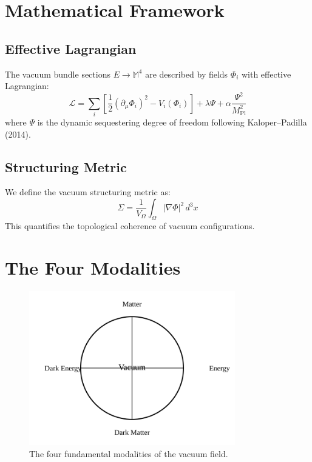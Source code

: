 \documentclass[12pt,a4paper]{article}
\newcommand{\structuring}{\Sigma}
\newcommand{\planck}{M_{\text{Pl}}}
\begin{document}
\section{Mathematical Framework}

\subsection{Effective Lagrangian}
The vacuum bundle sections $E \rightarrow \mathbb{M}^4$ are described by fields $\Phi_i$ with effective Lagrangian:
\begin{equation}
\mathcal{L} = \sum_i\left[\frac{1}{2}(\partial_\mu\Phi_i)^2 - V_i(\Phi_i)\right] + \lambda \Psi + \alpha\frac{\Psi^2}{\planck^2}
\label{eq:lagrangian}
\end{equation}
where $\Psi$ is the dynamic sequestering degree of freedom following Kaloper--Padilla (2014).

\subsection{Structuring Metric}
We define the vacuum structuring metric as:
\begin{equation}
\structuring = \frac{1}{V_\Omega}\int_\Omega |\nabla\Phi|^{2}\,d^{3}x
\label{eq:sigma}
\end{equation}
This quantifies the topological coherence of vacuum configurations.

\section{The Four Modalities}

\begin{figure}[h]
\centering
\includegraphics[width=0.8\textwidth]{../figures/fig3_modalities.svg}
\caption{The four fundamental modalities of the vacuum field.}
\label{fig:modalities}
\end{figure}
\end{document}
